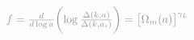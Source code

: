 \documentclass[preview]{standalone}
\begin{document}
$ \textcolor{Gray}{f=\frac{d}{d \log a} \biggl( \log \frac{\Delta(k,a)}{\Delta(k,a_i)} \biggr)= \bigl[ \Omega_m(a)\bigr]^{\gamma_L}} $
\end{document}
